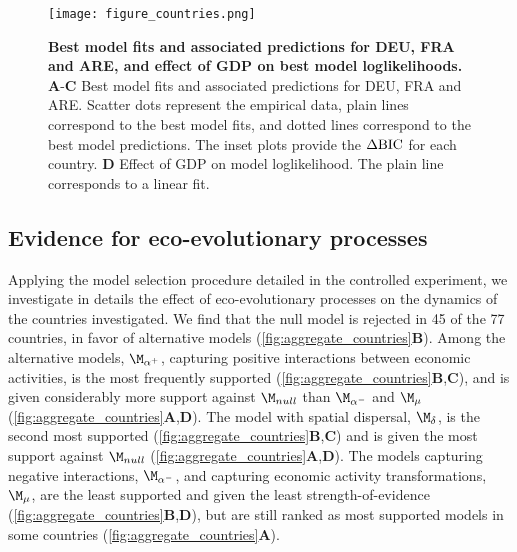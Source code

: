 \begin{figure}
  \centering
  \texttt{[image: figure\_countries.png]}
  \caption{\small \textbf{Best model fits and associated predictions for DEU, FRA and ARE, and effect of GDP on best model loglikelihoods.}
    \textbf{A}-\textbf{C} Best model fits and associated predictions for DEU, FRA and ARE. Scatter dots represent the empirical data, plain lines correspond to the best model fits, and dotted lines correspond to the best model predictions. The inset plots provide the $\Delta \text{BIC}$ for each country.
    \textbf{D} Effect of GDP on model loglikelihood. The plain line corresponds to a linear fit.
  }\label{fig:fits}
\end{figure}
\FloatBarrier

\subsection{Evidence for eco-evolutionary processes}

Applying the model selection procedure detailed in the controlled experiment, we investigate in details the effect of eco-evolutionary processes on the dynamics of the countries investigated. We find that the null model is rejected in 45 of the 77 countries, in favor of alternative models (\cref{fig:aggregate_countries}\textbf{B}).
% 
Among the alternative models, $\modalphap$, capturing positive interactions between economic activities, is the most frequently supported (\cref{fig:aggregate_countries}\textbf{B},\textbf{C}), and is given considerably more support against $\modnull$ than $\modalphan$ and $\modmu$ (\cref{fig:aggregate_countries}\textbf{A},\textbf{D}).
%
The model with spatial dispersal, $\moddelta$, is the second most supported (\cref{fig:aggregate_countries}\textbf{B},\textbf{C}) and is given the most support against $\modnull$ (\cref{fig:aggregate_countries}\textbf{A},\textbf{D}).
% 
The models capturing negative interactions, $\modalphan$, and capturing economic activity transformations, $\modmu$, are the least supported and given the least strength-of-evidence (\cref{fig:aggregate_countries}\textbf{B},\textbf{D}), but are still ranked as most supported models in some countries (\cref{fig:aggregate_countries}\textbf{A}). 


